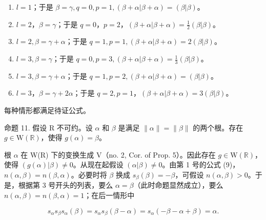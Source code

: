 \begin{enumerate}
\def\labelenumi{\arabic{enumi})}
\item
  \(l = 1\)；于是 \(\beta = \gamma, q = 0, p = 1, (\beta + \alpha | \beta + \alpha) = (\beta | \beta)\)。
\item
  \(l = 2\)，\(\beta = \gamma\)；于是 \(q = 0\)，\(p = 2\)，\((\beta + \alpha|\beta + \alpha) = \frac{1}{2} (\beta|\beta)\)。
\item
  \(l = 2, \beta = \gamma + \alpha\)；于是 \(q = 1, p = 1, (\beta + \alpha|\beta + \alpha) = 2(\beta|\beta)\)。
\item
  \(l = 3, \beta = \gamma\)；于是 \(q = 0, p = 3, (\beta + \alpha | \beta + \alpha) = \frac{1}{3} (\beta | \beta)\)。
\item
  \(l = 3, \beta = \gamma + \alpha\)；于是 \(q = 1, p = 2, (\beta + \alpha|\beta + \alpha) = (\beta|\beta)\)。
\item
  \(l = 3\)，\(\beta = \gamma + 2\alpha\)；于是 \(q = 2, p = 1\)，\((\beta + \alpha|\beta + \alpha) = 3(\beta|\beta)\)。
\end{enumerate}

每种情形都满足待证公式。

命题 11. 假设 R 不可约。设 \(\alpha\) 和 \(\beta\) 是满足 \(\| \alpha \| = \| \beta \|\) 的两个根。存在 \(g \in \mathrm{W}(\mathbb{R})\)，使得 \(g(\alpha) = \beta\)。

根 \(\alpha\) 在 W(R) 下的变换生成 V（no. 2, Cor. of Prop. 5）。因此存在 \(g \in \mathrm{W}(\mathbb{R})\)，使得 \((g(\alpha)|\beta) \neq 0\)。从现在起假设 \((\alpha|\beta) \neq 0\)。由第 1 号的公式 (9)，\(n(\alpha, \beta) = n(\beta, \alpha)\)。必要时将 \(\beta\) 换成 \(s_{\beta}(\beta) = -\beta\)，可假设 \(n(\alpha, \beta) > 0\)。于是，根据第 3 号开头的列表，要么 \(\alpha = \beta\)（此时命题显然成立），要么 \(n(\alpha, \beta) = n(\beta, \alpha) = 1\)；在后一情形中

\[
s _ {\alpha} s _ {\beta} s _ {\alpha} (\beta) = s _ {\alpha} s _ {\beta} (\beta - \alpha) = s _ {\alpha} (- \beta - \alpha + \beta) = \alpha .
\]

